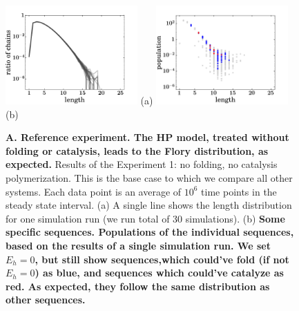 \documentclass[journal=jacsat,manuscript=article,layout=twocolumn]{achemso}
\begin{document}
\begin{figure}[hbt!]
  \centering
  \includegraphics[width=0.45\textwidth]{pictures/distrPlain-many.pdf} (a)
  \includegraphics[width=0.45\textwidth]{pictures/scatter01918.png} (b)
  \caption{\footnotesize{\textbf{A.  Reference experiment.  The HP model, treated without folding 
or catalysis, leads to the Flory distribution, as expected.}  Results of the Experiment 1: no 
folding, no catalysis polymerization. This 
is the base case to which we compare all other systems. Each data point is an average of 
$10^6$ time points in the steady state interval. (a) A single line shows the length distribution 
for one simulation run (we run total of 30 simulations). (b) \bf{Some specific sequences.}  
Populations of the individual sequences, based 
on the results of a single simulation run. 
We set $E_h=0$, but still show sequences,which could've fold (if not $E_h=0$) as 
blue, and sequences which could've catalyze as red. As expected, they follow the same distribution 
as other sequences.}}
  \label{fig:sim_pure_flory}
\end{figure}
\end{document}
